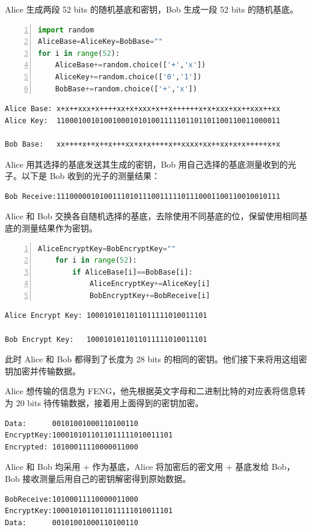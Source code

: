 \documentclass{ctexart}
\begin{document}
Alice 生成两段 52 bits 的随机基底和密钥，Bob 生成一段 52 bits 的随机基底。
\begin{lstlisting}[language=Python,numbers=left,caption=生成随机基底和密钥代码]
import random
AliceBase=AliceKey=BobBase=""
for i in range(52):
    AliceBase+=random.choice(['+','x'])
    AliceKey+=random.choice(['0','1'])
    BobBase+=random.choice(['+','x'])
\end{lstlisting}
\begin{lstlisting}
Alice Base: x+x++xxx+x++++xx+x+xxx+x++x++++++x+x+xxx+xx++xxx++xx
Alice Key:  1100010010100100010101001111101101101100110011000011
    
Bob Base:   xx++++x++x++x+++xx+x+x++++x++xxxx+xx++xx+x+x+++++x+x
\end{lstlisting}

Alice 用其选择的基底发送其生成的密钥，Bob 用自己选择的基底测量收到的光子。以下是 Bob 收到的光子的测量结果：
\begin{lstlisting}
Bob Receive:1110000010100111010111001111101110001100110010010111
\end{lstlisting}

Alice 和 Bob 交换各自随机选择的基底，去除使用不同基底的位，保留使用相同基底的测量结果作为密钥。
\begin{lstlisting}[language=Python,numbers=left,caption=求得最终密钥代码]
    AliceEncryptKey=BobEncryptKey=""
    for i in range(52):
        if AliceBase[i]==BobBase[i]:
            AliceEncryptKey+=AliceKey[i]
            BobEncryptKey+=BobReceive[i]
\end{lstlisting}
\begin{lstlisting}
Alice Encrypt Key: 1000101011011011111010011101

Bob Encrypt Key:   1000101011011011111010011101
\end{lstlisting}

此时 Alice 和 Bob 都得到了长度为 28 bits 的相同的密钥。他们接下来将用这组密钥加密并传输数据。

Alice 想传输的信息为 FENG，他先根据英文字母和二进制比特的对应表将信息转为 20 bits 待传输数据，接着用上面得到的密钥加密。
\begin{lstlisting}
Data:      00101001000110100110
EncryptKey:1000101011011011111010011101
Encrypted: 10100011110000011000
\end{lstlisting}

Alice 和 Bob 均采用 + 作为基底，Alice 将加密后的密文用 + 基底发给 Bob，Bob 接收测量后用自己的密钥解密得到原始数据。
\begin{lstlisting}
BobReceive:10100011110000011000
EncryptKey:1000101011011011111010011101
Data:      00101001000110100110
\end{lstlisting}
\end{document}
